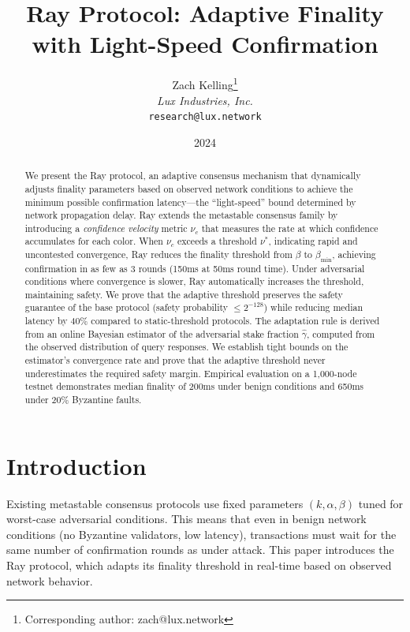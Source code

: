 \documentclass[11pt,a4paper]{article}
\title{\textbf{Ray Protocol: Adaptive Finality\\with Light-Speed Confirmation}}
\author{
Zach Kelling\thanks{Corresponding author: zach@lux.network}\\
\textit{Lux Industries, Inc.}\\
\texttt{research@lux.network}
}
\date{2024}
\begin{document}
\luxcoverpage

\begin{abstract}
We present the Ray protocol, an adaptive consensus mechanism that dynamically adjusts
finality parameters based on observed network conditions to achieve the minimum possible
confirmation latency---the ``light-speed'' bound determined by network propagation delay.
Ray extends the metastable consensus family by introducing a \emph{confidence velocity}
metric $\nu_c$ that measures the rate at which confidence accumulates for each color.
When $\nu_c$ exceeds a threshold $\nu^*$, indicating rapid and uncontested convergence,
Ray reduces the finality threshold from $\beta$ to $\beta_{\min}$, achieving confirmation
in as few as 3 rounds (150ms at 50ms round time). Under adversarial conditions where
convergence is slower, Ray automatically increases the threshold, maintaining safety.
We prove that the adaptive threshold preserves the safety guarantee of the base
protocol (safety probability $\leq 2^{-128}$) while reducing median latency by 40\%
compared to static-threshold protocols. The adaptation rule is derived from an online
Bayesian estimator of the adversarial stake fraction $\hat{\gamma}$, computed from the
observed distribution of query responses. We establish tight bounds on the estimator's
convergence rate and prove that the adaptive threshold never underestimates the
required safety margin. Empirical evaluation on a 1,000-node testnet demonstrates
median finality of 200ms under benign conditions and 650ms under 20\% Byzantine faults.
\end{abstract}

\tableofcontents
\newpage

\section{Introduction}
\label{sec:introduction}

Existing metastable consensus protocols use fixed parameters $(k, \alpha, \beta)$ tuned
for worst-case adversarial conditions. This means that even in benign network conditions
(no Byzantine validators, low latency), transactions must wait for the same number of
confirmation rounds as under attack. This paper introduces the Ray protocol, which
adapts its finality threshold in real-time based on observed network behavior.
\end{document}
